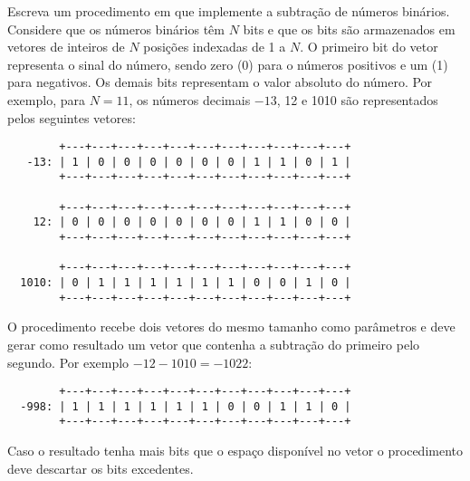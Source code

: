 \item Escreva um procedimento em  
que implemente a subtração de números
binários. Considere que os números binários têm $N$ bits e que os bits
são armazenados em vetores de inteiros de $N$ posições indexadas de 1 a 
$N$. O primeiro bit do vetor representa o sinal do número, sendo zero (0) 
para o números positivos e um (1) para negativos. Os demais bits 
representam o valor absoluto do número. Por exemplo, para $N=11$, os 
números decimais $-13$, 12 e 1010 são representados pelos seguintes 
vetores:
\begin{center}
\begin{small}
\begin{verbatim}
        +---+---+---+---+---+---+---+---+---+---+---+
   -13: | 1 | 0 | 0 | 0 | 0 | 0 | 0 | 1 | 1 | 0 | 1 |
        +---+---+---+---+---+---+---+---+---+---+---+

        +---+---+---+---+---+---+---+---+---+---+---+
    12: | 0 | 0 | 0 | 0 | 0 | 0 | 0 | 1 | 1 | 0 | 0 |
        +---+---+---+---+---+---+---+---+---+---+---+

        +---+---+---+---+---+---+---+---+---+---+---+
  1010: | 0 | 1 | 1 | 1 | 1 | 1 | 1 | 0 | 0 | 1 | 0 |
        +---+---+---+---+---+---+---+---+---+---+---+
\end{verbatim}
\end{small}
\end{center}
O procedimento recebe dois vetores do mesmo tamanho como parâmetros e 
deve gerar como resultado um vetor que contenha a subtração do 
primeiro pelo segundo. Por exemplo $-12 - 1010 = -1022$:
\begin{center}
\begin{small}
\begin{verbatim}
        +---+---+---+---+---+---+---+---+---+---+---+ 
  -998: | 1 | 1 | 1 | 1 | 1 | 1 | 0 | 0 | 1 | 1 | 0 |
        +---+---+---+---+---+---+---+---+---+---+---+ 
\end{verbatim}
\end{small}
\end{center}
Caso o resultado tenha mais bits que o espaço disponível no vetor
o procedimento deve descartar os bits excedentes. 

